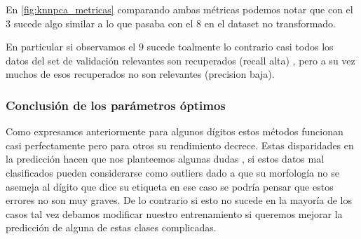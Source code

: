 En \ref{fig:knnpca_metricas} comparando ambas métricas podemos notar que con el $3$ sucede algo similar a lo que pasaba con el $8$ en el dataset no transformado.

En particular si observamos el $9$ sucede toalmente lo contrario casi todos los datos del set de validación relevantes son recuperados (recall alta) , pero a su vez muchos de esos recuperados no son relevantes (precision baja).




\subsubsection{Conclusión de los parámetros óptimos}


Como expresamos anteriormente para algunos dígitos estos métodos funcionan casi perfectamente pero para otros su rendimiento decrece. Estas disparidades en la predicción hacen que nos planteemos algunas dudas , si estos datos mal clasificados pueden  considerarse como outliers dado a que su morfología no se asemeja al dígito que dice su etiqueta en ese caso se podría pensar que estos errores no son muy graves. De lo contrario si esto no sucede en la mayoría de los casos tal vez debamos modificar nuestro entrenamiento si queremos mejorar la predicción de alguna de estas clases complicadas.

